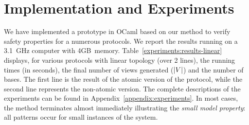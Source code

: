 \section{Implementation and Experiments}
\label{section:experiments}
%
We have implemented a prototype in OCaml based on our method to verify
safety properties for a numerous protocols.
%
We report the results running on a 3.1~GHz computer with 4GB~memory.
%
Table~\ref{experiments:results-linear} displays, for various protocols
with linear topology (over 2 lines), the running times (in seconds),
the final number of views generated ($|V|$) and the number of
bases.
%
The first line is the result of the atomic version of the protocol,
while the second line represents the non-atomic version.
%
The complete descriptions of the experiments can be found in
Appendix~\ref{appendix:experiments}.
%
In most cases, the method terminates almost immediately illustrating
the \emph{small model property}: all patterns occur for small
instances of the system.
%

